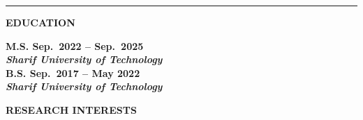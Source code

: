 \documentclass[12pt]{article}
\begin{document}

	\noindent\rule[0.5ex]{\linewidth}{.5pt}

\begin{center} %
	{\noindent \bfseries EDUCATION}
\end{center} %

 \vspace{-4pt} %

\noindent
 \bf{M.S.}
  \hfill Sep.\ 2022 -- Sep.\ 2025 \\
\noindent \textit{Sharif University of Technology} \\

\noindent
 \bf{B.S.}
 \hfill Sep.\ 2017 -- May 2022 \\
\noindent \textit{Sharif University of Technology} \\







\vspace{-8pt}
\begin{center}
	{\noindent \bfseries RESEARCH INTERESTS}
\end{center}
\end{document}
